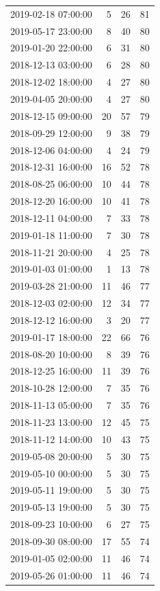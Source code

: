 \begin{tabular}{lrrr}
2019-02-18 07:00:00 & 5 & 26 & 81 \\
2019-05-17 23:00:00 & 8 & 40 & 80 \\
2019-01-20 22:00:00 & 6 & 31 & 80 \\
2018-12-13 03:00:00 & 6 & 28 & 80 \\
2018-12-02 18:00:00 & 4 & 27 & 80 \\
2019-04-05 20:00:00 & 4 & 27 & 80 \\
2018-12-15 09:00:00 & 20 & 57 & 79 \\
2018-09-29 12:00:00 & 9 & 38 & 79 \\
2018-12-06 04:00:00 & 4 & 24 & 79 \\
2018-12-31 16:00:00 & 16 & 52 & 78 \\
2018-08-25 06:00:00 & 10 & 44 & 78 \\
2018-12-20 16:00:00 & 10 & 41 & 78 \\
2018-12-11 04:00:00 & 7 & 33 & 78 \\
2019-01-18 11:00:00 & 7 & 30 & 78 \\
2018-11-21 20:00:00 & 4 & 25 & 78 \\
2019-01-03 01:00:00 & 1 & 13 & 78 \\
2019-03-28 21:00:00 & 11 & 46 & 77 \\
2018-12-03 02:00:00 & 12 & 34 & 77 \\
2018-12-12 16:00:00 & 3 & 20 & 77 \\
2019-01-17 18:00:00 & 22 & 66 & 76 \\
2018-08-20 10:00:00 & 8 & 39 & 76 \\
2018-12-25 16:00:00 & 11 & 39 & 76 \\
2018-10-28 12:00:00 & 7 & 35 & 76 \\
2018-11-13 05:00:00 & 7 & 35 & 76 \\
2018-11-23 13:00:00 & 12 & 45 & 75 \\
2018-11-12 14:00:00 & 10 & 43 & 75 \\
2019-05-08 20:00:00 & 5 & 30 & 75 \\
2019-05-10 00:00:00 & 5 & 30 & 75 \\
2019-05-11 19:00:00 & 5 & 30 & 75 \\
2019-05-13 19:00:00 & 5 & 30 & 75 \\
2018-09-23 10:00:00 & 6 & 27 & 75 \\
2018-09-30 08:00:00 & 17 & 55 & 74 \\
2019-01-05 02:00:00 & 11 & 46 & 74 \\
2019-05-26 01:00:00 & 11 & 46 & 74 \\

\end{tabular}

